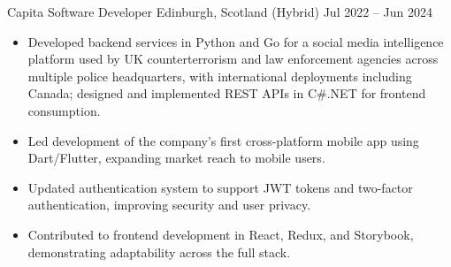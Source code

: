 
  \cventry
    {Capita} %
    {Software Developer} %
    {Edinburgh, Scotland (Hybrid)} %
    {Jul 2022 – Jun 2024} %
    {
        \begin{itemize}
            \item Developed backend services in Python and Go for a social media intelligence platform used by UK counterterrorism and law enforcement agencies across multiple police headquarters, with international deployments including Canada; designed and implemented REST APIs in C\#.NET for frontend consumption.
            \item Led development of the company's first cross-platform mobile app
                using Dart/Flutter, expanding market reach to mobile users.
            \item Updated authentication system to support JWT tokens and
                two-factor authentication, improving security and user privacy.
            \item Contributed to frontend development in React, Redux, and
                Storybook, demonstrating adaptability across the full stack.
        \end{itemize}
    }
